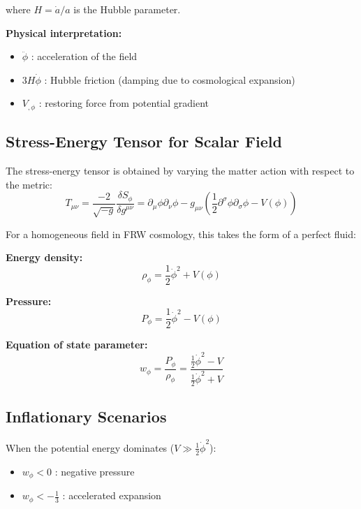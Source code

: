 \documentclass[11pt,a4paper]{article}
\begin{document}
where $H = \dot{a}/a$ is the Hubble parameter.

\textbf{Physical interpretation:}
\begin{itemize}
\item $\ddot{\phi}$ : acceleration of the field
\item $3H\dot{\phi}$ : Hubble friction (damping due to cosmological expansion)
\item $V_{,\phi}$ : restoring force from potential gradient
\end{itemize}

\subsection{Stress-Energy Tensor for Scalar Field}

The stress-energy tensor is obtained by varying the matter action with respect to the metric:
\begin{equation}
T_{\mu\nu} = \frac{-2}{\sqrt{-g}} \frac{\delta S_\phi}{\delta g^{\mu\nu}} = \partial_\mu \phi \partial_\nu \phi - g_{\mu\nu} \left( \frac{1}{2} \partial^\sigma \phi \partial_\sigma \phi - V(\phi) \right)
\end{equation}

For a homogeneous field in FRW cosmology, this takes the form of a perfect fluid:

\textbf{Energy density:}
\begin{equation}
\rho_\phi = \frac{1}{2} \dot{\phi}^2 + V(\phi)
\end{equation}

\textbf{Pressure:}
\begin{equation}
P_\phi = \frac{1}{2} \dot{\phi}^2 - V(\phi)
\end{equation}

\textbf{Equation of state parameter:}
\begin{equation}
w_\phi = \frac{P_\phi}{\rho_\phi} = \frac{\frac{1}{2}\dot{\phi}^2 - V}{\frac{1}{2}\dot{\phi}^2 + V}
\end{equation}

\subsection{Inflationary Scenarios}

When the potential energy dominates ($V \gg \frac{1}{2}\dot{\phi}^2$):
\begin{itemize}
\item $w_\phi < 0$ : negative pressure
\item $w_\phi < -\frac{1}{3}$ : accelerated expansion
\end{itemize}
\end{document}
